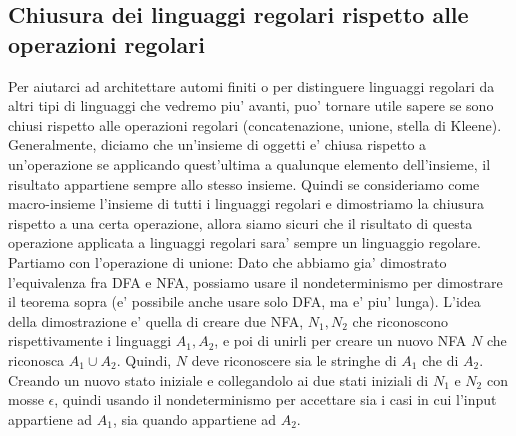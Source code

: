 \subsection{Chiusura dei linguaggi regolari rispetto alle operazioni regolari}
Per aiutarci ad architettare automi finiti o per distinguere linguaggi regolari da altri tipi di linguaggi che vedremo piu' avanti, puo' tornare utile sapere se sono chiusi rispetto alle operazioni regolari (concatenazione, unione, stella di Kleene). Generalmente, diciamo che un'insieme di oggetti e' chiusa rispetto a un'operazione se applicando quest'ultima a qualunque elemento dell'insieme, il risultato appartiene sempre allo stesso insieme. Quindi se consideriamo come macro-insieme l'insieme di tutti i linguaggi regolari e dimostriamo la chiusura rispetto a una certa operazione, allora siamo sicuri che il risultato di questa operazione applicata a linguaggi regolari sara' sempre un linguaggio regolare. Partiamo con l'operazione di unione:
Dato che abbiamo gia' dimostrato l'equivalenza fra DFA e NFA, possiamo usare il nondeterminismo per dimostrare il teorema sopra (e' possibile anche usare solo DFA, ma e' piu' lunga). L'idea della dimostrazione e' quella di creare due NFA, $ N_1, N_2 $ che riconoscono rispettivamente i linguaggi $ A_1, A_2 $, e poi di unirli per creare un nuovo NFA $ N $ che riconosca $ A_1 \cup A_2 $. Quindi, $ N $ deve riconoscere sia le stringhe di $ A_1 $ che di $ A_2 $. Creando un nuovo stato iniziale e collegandolo ai due stati iniziali di $ N_1 $ e $ N_2 $ con mosse $ \epsilon $, quindi usando il nondeterminismo per accettare sia i casi in cui l'input appartiene ad $ A_1 $, sia quando appartiene ad $ A_2 $. 
